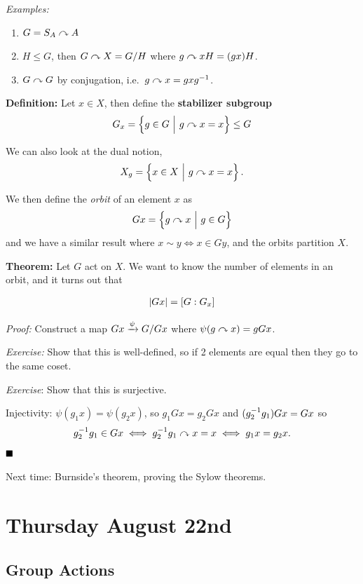 \emph{Examples:}

\begin{enumerate}
\def\labelenumi{\arabic{enumi}.}
\item
  \(G = S_{A} \curvearrowright A\)
\item
  \(H \leq G\), then \(G \curvearrowright X = G/H\) where
  \(g \curvearrowright xH = (gx)H\).
\item
  \(G \curvearrowright G\) by conjugation, i.e.~\(g\curvearrowright x = gxg^{-1}\).
\end{enumerate}

\textbf{Definition:} Let \(x\in X\), then define the \textbf{stabilizer
subgroup} \[
G_{x} = \left\{{g\in G {~\mathrel{\Big|}~} g\curvearrowright x = x}\right\} \leq G
\]

We can also look at the dual notion, \[
X_{g} = \left\{{x\in X {~\mathrel{\Big|}~} g\curvearrowright x = x}\right\}.
\]

We then define the \emph{orbit} of an element \(x\) as \[
Gx = \left\{{g\curvearrowright x {~\mathrel{\Big|}~} g\in G}\right\}
\] and we have a similar result where \(x\sim y \iff x\in Gy\), and the
orbits partition \(X\).

\textbf{Theorem:} Let \(G\) act on \(X\). We want to know the number of
elements in an orbit, and it turns out that

\begin{align*}
{\left\lvert {Gx} \right\rvert} = [G: G_{x}]
\end{align*}

\emph{Proof:} Construct a map \(Gx \xrightarrow{\psi} G/Gx\) where
\(\psi(g\curvearrowright x) = g Gx\).

\emph{Exercise:} Show that this is well-defined, so if 2 elements are
equal then they go to the same coset.

\emph{Exercise}: Show that this is surjective.

Injectivity: \(\psi(g_{1} x) = \psi(g_{2} x)\), so
\(g_{1} Gx = g_{2} Gx\) and \((g_{2}^{-1} g_{1}) Gx = Gx\) so \[
g_{2}^{-1} g_{1} \in Gx \iff g_{2}^{-1} g_{1} \curvearrowright x = x \iff g_{1}x = g_{2} x
.\] \(\qed\)

Next time: Burnside's theorem, proving the Sylow theorems.

\hypertarget{thursday-august-22nd}{%
\section{Thursday August 22nd}\label{thursday-august-22nd}}

\hypertarget{group-actions}{%
\subsection{Group Actions}\label{group-actions}}

